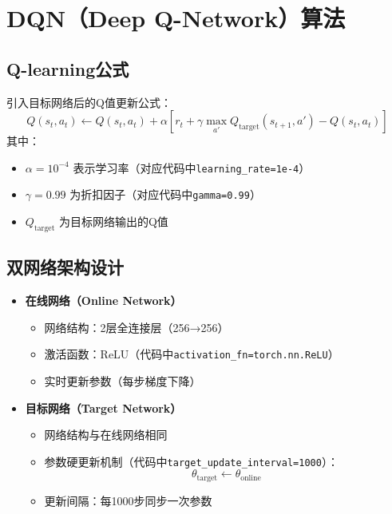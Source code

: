 \section{DQN（Deep Q-Network）算法}
\subsection{Q-learning公式}
引入目标网络后的Q值更新公式：
\[
Q(s_t,a_t) \leftarrow Q(s_t,a_t) + \alpha\left[r_t + \gamma \max_{a'}Q_{\text{target}}(s_{t+1},a') - Q(s_t,a_t)\right]
\]
其中：
\begin{itemize}
    \item $\alpha=10^{-4}$ 表示学习率（对应代码中\texttt{learning\_rate=1e-4}）
    \item $\gamma=0.99$ 为折扣因子（对应代码中\texttt{gamma=0.99}）
    \item $Q_{\text{target}}$ 为目标网络输出的Q值
\end{itemize}

\subsection{双网络架构设计}
\begin{itemize}
    \item \textbf{在线网络（Online Network）}
    \begin{itemize}
        \item 网络结构：2层全连接层（256→256）
        \item 激活函数：ReLU（代码中\texttt{activation\_fn=torch.nn.ReLU}）
        \item 实时更新参数（每步梯度下降）
    \end{itemize}
    
    \item \textbf{目标网络（Target Network）}
    \begin{itemize}
        \item 网络结构与在线网络相同
        \item 参数硬更新机制（代码中\texttt{target\_update\_interval=1000}）：
        \[
        \theta_{\text{target}} \leftarrow \theta_{\text{online}}
        \]
        \item 更新间隔：每1000步同步一次参数
    \end{itemize}
\end{itemize}

